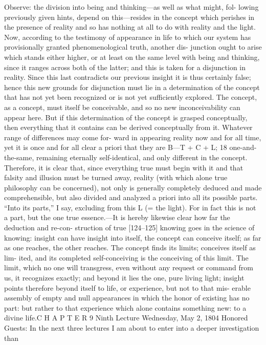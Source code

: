 Observe: the division into being and thinking—as well as what might, fol-
lowing previously given hints, depend on this—resides in the concept which
perishes in the presence of reality and so has nothing at all to do with reality
and the light. Now, according to the testimony of appearance in life to which
our system has provisionally granted phenomenological truth, another dis-
junction ought to arise which stands either higher, or at least on the same level
with being and thinking, since it ranges across both of the latter; and this is
taken for a disjunction in reality. Since this last contradicts our previous
insight it is thus certainly false; hence this new grounds for disjunction must
lie in a determination of the concept that has not yet been recognized or is not
yet sufficiently explored. The concept, as a concept, must itself be conceivable,
and so no new inconceivability can appear here. But if this determination of
the concept is grasped conceptually, then everything that it contains can be
derived conceptually from it. Whatever range of differences may come for-
ward in appearing reality now and for all time, yet it is once and for all clear
a priori that they are B—T + C + L; 18 one-and-the-same, remaining eternally
self-identical, and only different in the concept. Therefore, it is clear that,
since everything true must begin with it and that falsity and illusion must be
turned away, reality (with which alone true philosophy can be concerned), not
only is generally completely deduced and made comprehensible, but also
divided and analyzed a priori into all its possible parts. “Into its parts,” I say,
excluding from this L (= the light). For in fact this is not a part, but the one
true essence.—It is hereby likewise clear how far the deduction and re-con-
struction of true [124–125] knowing goes in the science of knowing: insight
can have insight into itself, the concept can conceive itself; as far as one
reaches, the other reaches. The concept finds its limits; conceives itself as lim-
ited, and its completed self-conceiving is the conceiving of this limit. The
limit, which no one will transgress, even without any request or command
from us, it recognizes exactly; and beyond it lies the one, pure living light;
insight points therefore beyond itself to life, or experience, but not to that mis-
erable assembly of empty and null appearances in which the honor of existing
has no part: but rather to that experience which alone contains something
new: to a divine life.C H A P T E R
9
Ninth Lecture
Wednesday, May 2, 1804
Honored Guests:
In the next three lectures I am about to enter into a deeper investigation than

